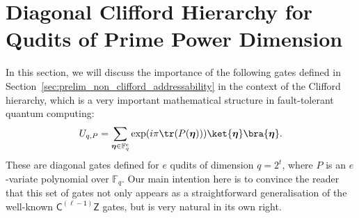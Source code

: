 \documentclass[11pt]{article}
\theoremstyle{definition}
\newcommand{\CLZ}{\mathsf{C^{(\ell-1)}Z}}
\begin{document}
\section{Diagonal Clifford Hierarchy for Qudits of Prime Power Dimension}
\label{sec:diagonal_Clifford}
In this section, we will discuss the importance of the following gates defined in Section~\ref{sec:prelim_non_clifford_addressability} in the context of the Clifford hierarchy, which is a very important mathematical structure in fault-tolerant quantum computing:
\begin{align}
    U_{q,P} = \sum_{\boldsymbol{\eta} \in \mathbb{F}_q^e}\exp(i\pi\tr(P(\boldsymbol{\eta})))\ket{\boldsymbol{\eta}}\bra{\boldsymbol{\eta}}.
\end{align}
These are diagonal gates defined for $e$ qudits of dimension $q=2^t$, where $P$ is an $e$-variate polynomial over $\mathbb{F}_q$.
Our main intention here is to convince the reader that this set of gates not only appears as a straightforward generalisation of the well-known $\CLZ$ gates, but is very natural in its own right. 
\end{document}
